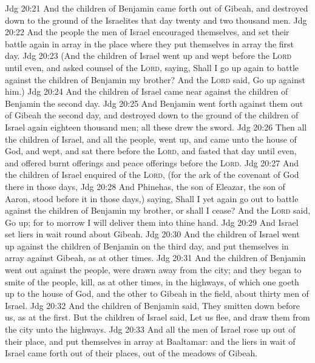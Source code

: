 \vs Jdg 20:21 And the children of Benjamin came forth out of Gibeah, and destroyed down to the ground of the Israelites that day twenty and two thousand men.
\vs Jdg 20:22 And the people the men of Israel encouraged themselves, and set their battle again in array in the place where they put themselves in array the first day.
\vs Jdg 20:23 (And the children of Israel went up and wept before the \textsc{Lord} until even, and asked counsel of the \textsc{Lord}, saying, Shall I go up again to battle against the children of Benjamin my brother? And the \textsc{Lord} said, Go up against him.)
\vs Jdg 20:24 And the children of Israel came near against the children of Benjamin the second day.
\vs Jdg 20:25 And Benjamin went forth against them out of Gibeah the second day, and destroyed down to the ground of the children of Israel again eighteen thousand men; all these drew the sword.
\vs Jdg 20:26 Then all the children of Israel, and all the people, went up, and came unto the house of God, and wept, and sat there before the \textsc{Lord}, and fasted that day until even, and offered burnt offerings and peace offerings before the \textsc{Lord}.
\vs Jdg 20:27 And the children of Israel enquired of the \textsc{Lord}, (for the ark of the covenant of God  there in those days,
\vs Jdg 20:28 And Phinehas, the son of Eleazar, the son of Aaron, stood before it in those days,) saying, Shall I yet again go out to battle against the children of Benjamin my brother, or shall I cease? And the \textsc{Lord} said, Go up; for to morrow I will deliver them into thine hand.
\vs Jdg 20:29 And Israel set liers in wait round about Gibeah.
\vs Jdg 20:30 And the children of Israel went up against the children of Benjamin on the third day, and put themselves in array against Gibeah, as at other times.
\vs Jdg 20:31 And the children of Benjamin went out against the people,  were drawn away from the city; and they began to smite of the people,  kill, as at other times, in the highways, of which one goeth up to the house of God, and the other to Gibeah in the field, about thirty men of Israel.
\vs Jdg 20:32 And the children of Benjamin said, They  smitten down before us, as at the first. But the children of Israel said, Let us flee, and draw them from the city unto the highways.
\vs Jdg 20:33 And all the men of Israel rose up out of their place, and put themselves in array at Baaltamar: and the liers in wait of Israel came forth out of their places,  out of the meadows of Gibeah.

